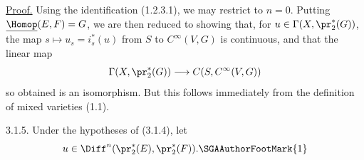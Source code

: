 \uline{Proof.} Using the identification (1.2.3.1), we may restrict to $n=0$. Putting $\underline{\Homop}(E,F)=G$, we are then reduced to showing that, for $u\in\Gamma(X,\pr_2^*(G))$, the map $s\mapsto u_s=i_s^*(u)$ from $S$ to $C^\infty(V,G)$ is continuous, and that the linear map
\[
  \Gamma(X,\pr_2^*(G))\longrightarrow C(S,C^\infty(V,G))
\]
so obtained is an isomorphism. But this follows immediately from the definition of mixed varieties (1.1).

3.1.5. Under the hypotheses of (3.1.4), let
\[
  u\in\Diff^n(\pr_2^*(E),\pr_2^*(F)).\text{\SGAAuthorFootMark{1}}
\]

